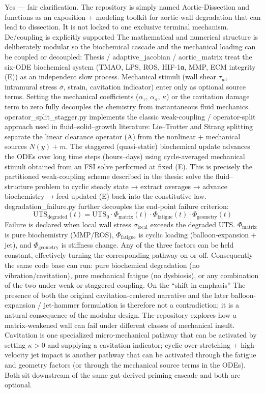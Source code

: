 Yes — fair clarification. The repository is simply named Aortic-Dissection and functions as an exposition + modeling toolkit for aortic-wall degradation that can lead to dissection. It is not locked to one exclusive terminal mechanism.
De/coupling is explicitly supported
The mathematical and numerical structure is deliberately modular so the biochemical cascade and the mechanical loading can be coupled or decoupled:
Thesis / adaptive_jacobian / aortic_matrix treat the six-ODE biochemical system (TMAO, LPS, ROS, HIF-1α, MMP, ECM integrity (E)) as an independent slow process. Mechanical stimuli (wall shear \(\overline{\tau}_w\), intramural stress \(\overline{\sigma}\), strain, cavitation indicator) enter only as optional source terms. Setting the mechanical coefficients (\(\alpha_\tau\), \(\alpha_\sigma\), \(\kappa\)) or the cavitation damage term to zero fully decouples the chemistry from instantaneous fluid mechanics.
operator_split_stagger.py implements the classic weak-coupling / operator-split approach used in fluid–solid–growth literature:
Lie–Trotter and Strang splitting separate the linear clearance operator (A) from the nonlinear + mechanical sources \(N(y)+m\).
The staggered (quasi-static) biochemical update advances the ODEs over long time steps (hours–days) using cycle-averaged mechanical stimuli obtained from an FSI solve performed at fixed (E).
This is precisely the partitioned weak-coupling scheme described in the thesis: solve the fluid–structure problem to cyclic steady state → extract averages → advance biochemistry → feed updated (E) back into the constitutive law.
degradation_failure.py further decouples the end-point failure criterion:\[
\mathrm{UTS_{degraded}}(t)=\mathrm{UTS}_0\cdot\Phi_{\mathrm{matrix}}(t)\cdot\Phi_{\mathrm{fatigue}}(t)\cdot\Phi_{\mathrm{geometry}}(t)
\]Failure is declared when local wall stress \(\sigma_{\mathrm{local}}\) exceeds the degraded UTS. \(\Phi_{\mathrm{matrix}}\) is pure biochemistry (MMP/ROS), \(\Phi_{\mathrm{fatigue}}\) is cyclic loading (balloon-expansion + jet), and \(\Phi_{\mathrm{geometry}}\) is stiffness change. Any of the three factors can be held constant, effectively turning the corresponding pathway on or off.
Consequently the same code base can run:
pure biochemical degradation (no vibration/cavitation),
pure mechanical fatigue (no dysbiosis),
or any combination of the two under weak or staggered coupling.
On the “shift in emphasis”
The presence of both the original cavitation-centered narrative and the later balloon-expansion / jet-hammer formulation is therefore not a contradiction; it is a natural consequence of the modular design. The repository explores how a matrix-weakened wall can fail under different classes of mechanical insult. Cavitation is one specialized micro-mechanical pathway that can be activated by setting \(\kappa>0\) and supplying a cavitation indicator; cyclic over-stretching + high-velocity jet impact is another pathway that can be activated through the fatigue and geometry factors (or through the mechanical source terms in the ODEs). Both sit downstream of the same gut-derived priming cascade and both are optional.

